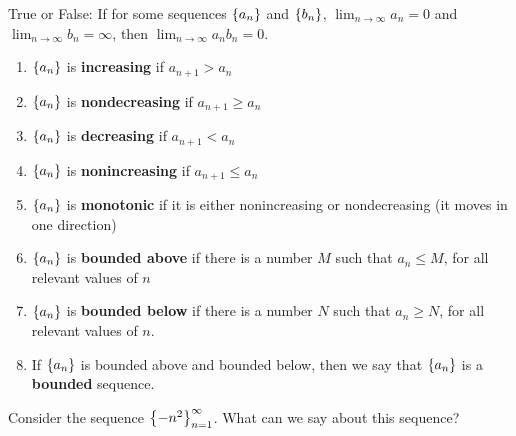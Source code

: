 \documentclass[../mathNotesPreamble]{subfiles}
\begin{document}
  \noindent
  True or False: If for some sequences ${\left\{a_n\right\}}$ and ${\left\{b_n\right\}}$, $\displaystyle\lim_{n\to \infty}a_n=0$ and $\displaystyle\lim_{n\to \infty} b_n=\infty$, then $\displaystyle\lim_{n\to \infty} a_nb_n=0$.
  \pagebreak

  \begin{defn*}
    \begin{enumerate}[label=\textbullet, itemsep=15pt]
      \item ${\left\{a_n\right\}}$ is \textbf{increasing} if $a_{n+1}>a_n$
      \item ${\left\{a_n\right\}}$ is \textbf{nondecreasing} if $a_{n+1}\geq a_n$
      \item ${\left\{a_n\right\}}$ is \textbf{decreasing} if $a_{n+1}< a_n$
      \item ${\left\{a_n\right\}}$ is \textbf{nonincreasing} if $a_{n+1}\leq a_n$
      \item ${\left\{a_n\right\}}$ is \textbf{monotonic} if it is either nonincreasing or nondecreasing (it moves in one direction)
      \item ${\left\{a_n\right\}}$ is \textbf{bounded above} if there is a number $M$ such that $a_n\leq M$, for all relevant values of $n$
      \item ${\left\{a_n\right\}}$ is \textbf{bounded below} if there is a number $N$ such that $a_n\geq N$, for all relevant values of $n$.
      \item If ${\left\{a_n\right\}}$ is bounded above and bounded below, then we say that ${\left\{a_n\right\}}$ is a \textbf{bounded} sequence.
    \end{enumerate}
  \end{defn*}
  \begin{ex*}
    Consider the sequence ${\left\{-n^2\right\}}_{n=1}^{\infty}$. What can we say about this sequence?
  \end{ex*}
  \pagebreak
\end{document}
